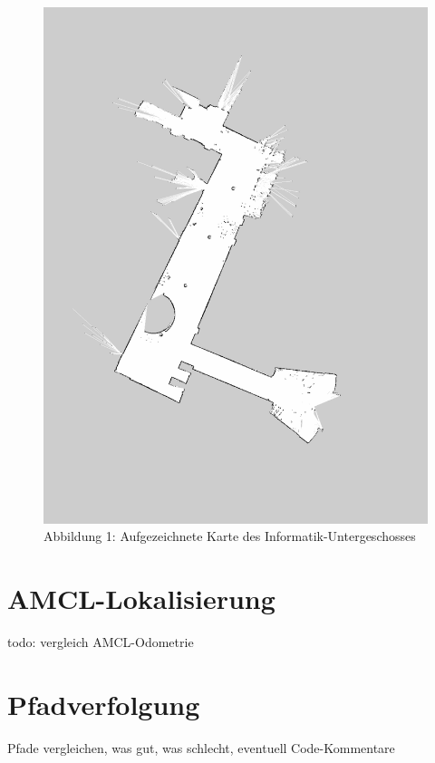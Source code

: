 \documentclass[11pt,a4paper]{article}
\begin{document}
\begin{figure}[H]
  \caption*{Abbildung 1: Aufgezeichnete Karte des Informatik-Untergeschosses}
  \includegraphics[scale = 0.3, angle = 90]{map.pdf}
  \centering
\end{figure}




\section{AMCL-Lokalisierung}
todo: vergleich AMCL-Odometrie

\section{Pfadverfolgung}
Pfade vergleichen, was gut, was schlecht, eventuell Code-Kommentare 
\end{document}
